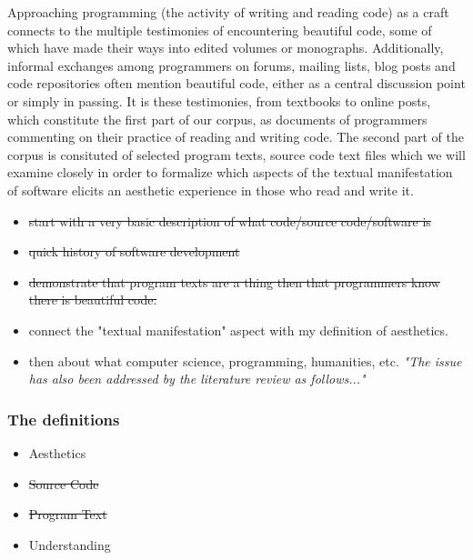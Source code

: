 Approaching programming (the activity of writing and reading code) as a craft\cite{levy_programmation_1992} connects to the multiple testimonies of encountering beautiful code, some of which have made their ways into edited volumes or monographs\cite{oram_beautiful_2007,chandra_geek_2014,gabriel_patterns_1998}. Additionally, informal exchanges among programmers on forums, mailing lists, blog posts and code repositories often mention beautiful code, either as a central discussion point or simply in passing. It is these testimonies, from textbooks to online posts, which constitute the first part of our corpus, as documents of programmers commenting on their practice of reading and writing code. The second part of the corpus is consituted of selected program texts, source code text files which we will examine closely in order to formalize which aspects of the textual manifestation of software elicits an aesthetic experience in those who read and write it.

\begin{itemize}
    \item \sout{start with a very basic description of what code/source code/software is}
    \item \sout{quick history of software development}
    \item \sout{demonstrate that program texts are a thing then that programmers know there is beautiful code.}
    \item connect the "textual manifestation" aspect with my definition of aesthetics.
    \item then about what computer science, programming, humanities, etc. \emph{"The issue has also been addressed by the literature review as follows..."}
\end{itemize}


\subsubsection{The definitions}

\begin{itemize}
    \item Aesthetics
    \item \sout{Source Code}
    \item \sout{Program Text}
    \item Understanding
\end{itemize}

